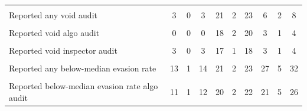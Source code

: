 {\begin{tabular}{l*{9}{c}}
            &                     &                     &                     &                     &                     &                     &                     &                     &                     \\
Reported any void audit&           3         &           0         &           3         &          21         &           2         &          23         &           6         &           2         &           8         \\
            &                     &                     &                     &                     &                     &                     &                     &                     &                     \\
Reported void algo audit&           0         &           0         &           0         &          18         &           2         &          20         &           3         &           1         &           4         \\
            &                     &                     &                     &                     &                     &                     &                     &                     &                     \\
Reported void inspector audit&           3         &           0         &           3         &          17         &           1         &          18         &           3         &           1         &           4         \\
            &                     &                     &                     &                     &                     &                     &                     &                     &                     \\
Reported any below-median evasion rate&          13         &           1         &          14         &          21         &           2         &          23         &          27         &           5         &          32         \\
            &                     &                     &                     &                     &                     &                     &                     &                     &                     \\
Reported below-median evasion rate algo audit&          11         &           1         &          12         &          20         &           2         &          22         &          21         &           5         &          26         \\

\end{tabular}}
